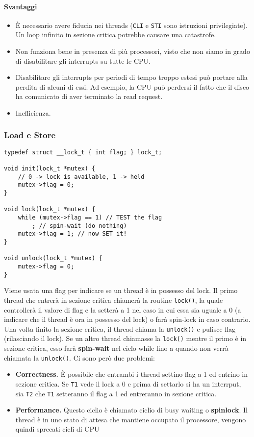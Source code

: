 \documentclass[12pt, twoside, letterpaper]{article}
\begin{document}
				\paragraph{Svantaggi}
					\begin{itemize}
						\item È necessario avere fiducia nei threads (\texttt{CLI} e \texttt{STI} sono istruzioni privilegiate). Un loop infinito in sezione critica potrebbe causare una catastrofe.
						\item Non funziona bene in presenza di più processori, visto che non siamo in grado di disabilitare gli interrupts su tutte le CPU.
						\item Disabilitare gli interrupts per periodi di tempo troppo estesi può portare alla perdita di alcuni di essi. Ad esempio, la CPU può perdersi il fatto che il disco ha comunicato di aver terminato la read request.
						\item Inefficienza.	
					\end{itemize}
			\subsubsection{Load e Store}
				\begin{lstlisting}[style=CStyle]
typedef struct __lock_t { int flag; } lock_t;

void init(lock_t *mutex) {
	// 0 -> lock is available, 1 -> held
	mutex->flag = 0;
}

void lock(lock_t *mutex) {
	while (mutex->flag == 1) // TEST the flag
		; // spin-wait (do nothing)
	mutex->flag = 1; // now SET it!
}

void unlock(lock_t *mutex) {
	mutex->flag = 0;
}				\end{lstlisting}
				Viene usata una flag per indicare se un thread è in possesso del lock. Il primo thread che entrerà in sezione critica chiamerà la routine \texttt{lock()}, la quale controllerà il valore di flag e la setterà a 1 nel caso in cui essa sia uguale a 0 (a indicare che il thread è ora in possesso del lock) o farà spin-lock in caso contrario. Una volta finito la sezione critica, il thread chiama la \texttt{unlock()} e pulisce flag (rilasciando il lock). Se un altro thread chiamasse la \texttt{lock()} mentre il primo è in sezione critica, esso farà \textbf{spin-wait} nel ciclo while fino a quando non verrà chiamata la \texttt{unlock()}. Ci sono però due problemi:
				\begin{itemize}
					\item \textbf{Correctness.} È possibile che entrambi i thread settino flag a 1 ed entrino in sezione critica. Se \texttt{T1} vede il lock a 0 e prima di settarlo si ha un interrput, sia \texttt{T2} che \texttt{T1} setteranno il flag a 1 ed entreranno in sezione critica.
					\item \textbf{Performance.} Questo ciclio è chiamato ciclio di busy waiting o \textbf{spinlock}. Il thread è in uno stato di attesa che mantiene occupato il processore, vengono quindi sprecati cicli di CPU
				\end{itemize}
				
\end{document}
